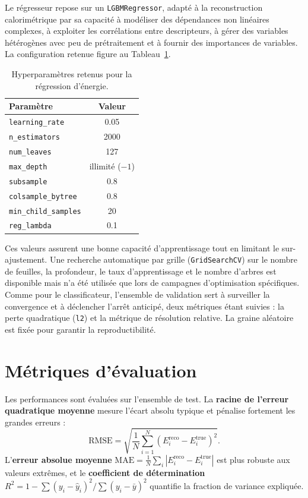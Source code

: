 Le régresseur repose sur un \texttt{LGBMRegressor}, adapté à la reconstruction calorimétrique par sa capacité à modéliser des dépendances non linéaires complexes, à exploiter les corrélations entre descripteurs, à gérer des variables hétérogènes avec peu de prétraitement et à fournir des importances de variables. La configuration retenue figure au Tableau~\ref{tab:energy-hyperparams}.

\begin{table}[!ht]
    \centering
    \caption{Hyperparamètres retenus pour la régression d'énergie.}
    \label{tab:energy-hyperparams}
    \small
    \begin{tabular}{lc}
        \toprule
        \textbf{Paramètre} & \textbf{Valeur} \\
        \midrule
        \texttt{learning\_rate} & 0.05 \\
        \texttt{n\_estimators} & 2000 \\
        \texttt{num\_leaves} & 127 \\
        \texttt{max\_depth} & illimité (\(-1\)) \\
        \texttt{subsample} & 0.8 \\
        \texttt{colsample\_bytree} & 0.8 \\
        \texttt{min\_child\_samples} & 20 \\
        \texttt{reg\_lambda} & 0.1 \\
        \bottomrule
    \end{tabular}
\end{table}

Ces valeurs assurent une bonne capacité d'apprentissage tout en limitant le sur-ajustement. Une recherche automatique par grille (\texttt{GridSearchCV}) sur le nombre de feuilles, la profondeur, le taux d'apprentissage et le nombre d'arbres est disponible mais n'a été utilisée que lors de campagnes d'optimisation spécifiques. Comme pour le classificateur, l'ensemble de validation sert à surveiller la convergence et à déclencher l'arrêt anticipé, deux métriques étant suivies : la perte quadratique (\texttt{l2}) et la métrique de résolution relative. La graine aléatoire est fixée pour garantir la reproductibilité.

\section{Métriques d'évaluation}

Les performances sont évaluées sur l'ensemble de test. La \textbf{racine de l'erreur quadratique moyenne} mesure l'écart absolu typique et pénalise fortement les grandes erreurs :
\[
\mathrm{RMSE} =
\sqrt{
\frac{1}{N}
\sum_{i=1}^{N}
\left(E_i^{\mathrm{reco}}-E_i^{\mathrm{true}}\right)^2
}.
\]
L'\textbf{erreur absolue moyenne} \(\mathrm{MAE} = \frac{1}{N}\sum_i |E_i^{\mathrm{reco}}-E_i^{\mathrm{true}}|\) est plus robuste aux valeurs extrêmes, et le \textbf{coefficient de détermination} \(R^2 = 1 - \sum (y_i-\hat y_i)^2 / \sum (y_i-\bar y)^2\) quantifie la fraction de variance expliquée.

